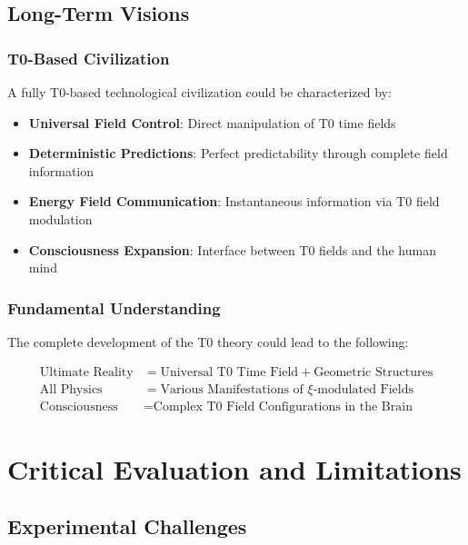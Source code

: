 \documentclass[12pt,a4paper]{article}
\begin{document}
	\subsection{Long-Term Visions}
	
	\subsubsection{T0-Based Civilization}
	
	A fully T0-based technological civilization could be characterized by:
	
	\begin{itemize}
		\item \textbf{Universal Field Control}: Direct manipulation of T0 time fields
		\item \textbf{Deterministic Predictions}: Perfect predictability through complete field information
		\item \textbf{Energy Field Communication}: Instantaneous information via T0 field modulation
		\item \textbf{Consciousness Expansion}: Interface between T0 fields and the human mind
	\end{itemize}
	
	\subsubsection{Fundamental Understanding}
	
	The complete development of the T0 theory could lead to the following:
	
	\begin{align}
		\text{Ultimate Reality} &= \text{Universal T0 Time Field} + \text{Geometric Structures} \\
		\text{All Physics} &= \text{Various Manifestations of } \xi\text{-modulated Fields} \\
		\text{Consciousness} &= \text{Complex T0 Field Configurations in the Brain}
	\end{align}
	
	\section{Critical Evaluation and Limitations}
	
	
	
	\subsection{Experimental Challenges}
	
\end{document}
